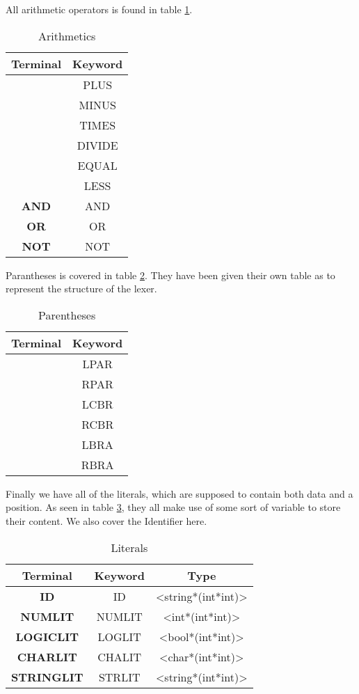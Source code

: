 \documentclass[10pt]{article}
\begin{document}
All arithmetic operators is found in table \ref{tab:arithmetics}.

\begin{table}[h!]
\centering
\begin{tabular}{|c|c|}
\hline
Terminal & Keyword \\
\hline
\text{+} & PLUS \\
\text{-} & MINUS \\
\text{*} & TIMES \\
\text{/} & DIVIDE \\
\text{=} & EQUAL \\
\text{<} & LESS \\
\textbf{AND} & AND \\
\textbf{OR} & OR \\
\textbf{NOT} & NOT \\
\hline
\end{tabular}
\caption{\label{tab:arithmetics}Arithmetics}
\end{table}

Parantheses is covered in table \ref{tab:parentheses}. They have been given their own table as to represent the structure of the lexer. 

\begin{table}[h!]
\centering
\begin{tabular}{|c|c|}
\hline
Terminal & Keyword \\
\hline
\text{(} & LPAR \\
\text{)} & RPAR \\
\text{\{} & LCBR \\
\text{\}} & RCBR \\
\text{[} & LBRA \\
\text{]} & RBRA \\
\hline
\end{tabular}
\caption{\label{tab:parentheses}Parentheses}
\end{table}

Finally we have all of the literals, which are supposed to contain both data and a position. As seen in table \ref{tab:literals}, they all make use of some sort of variable to store their content. We also cover the Identifier here.

\begin{table}[!h]
\centering
\begin{tabular}{|c|c|c|}
\hline
Terminal & Keyword & Type\\
\hline
\textbf{ID} & ID & <string*(int*int)>\\
\textbf{NUMLIT} & NUMLIT & <int*(int*int)>\\
\textbf{LOGICLIT} & LOGLIT & <bool*(int*int)> \\
\textbf{CHARLIT} & CHALIT & <char*(int*int)> \\
\textbf{STRINGLIT} & STRLIT & <string*(int*int)> \\
\hline
\end{tabular}
\caption{\label{tab:literals}Literals}
\end{table}
\end{document}
